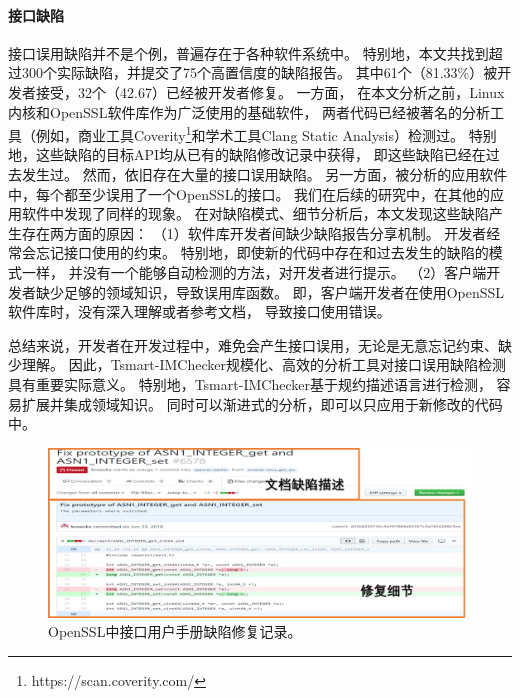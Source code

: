 \paragraph{接口缺陷}
接口误用缺陷并不是个例，普遍存在于各种软件系统中。
特别地，本文共找到超过300个实际缺陷，并提交了75个高置信度的缺陷报告。
其中61个（81.33\%）被开发者接受，32个（42.67）已经被开发者修复。
一方面，
在本文分析之前，Linux内核和OpenSSL软件库作为广泛使用的基础软件，
两者代码已经被著名的分析工具（例如，商业工具Coverity\footnote{https://scan.coverity.com/}和学术工具Clang Static Analysis）检测过。
特别地，这些缺陷的目标API均从已有的缺陷修改记录中获得，
即这些缺陷已经在过去发生过。
然而，依旧存在大量的接口误用缺陷。
另一方面，被分析的应用软件中，每个都至少误用了一个OpenSSL的接口。
我们在后续的研究中，在其他的应用软件中发现了同样的现象。
在对缺陷模式、细节分析后，本文发现这些缺陷产生存在两方面的原因：
（1）软件库开发者间缺少缺陷报告分享机制。
开发者经常会忘记接口使用的约束。
特别地，即使新的代码中存在和过去发生的缺陷的模式一样，
并没有一个能够自动检测的方法，对开发者进行提示。
（2）客户端开发者缺少足够的领域知识，导致误用库函数。
即，客户端开发者在使用OpenSSL软件库时，没有深入理解或者参考文档，
导致接口使用错误。

总结来说，开发者在开发过程中，难免会产生接口误用，无论是无意忘记约束、缺少理解。
因此，Tsmart-IMChecker规模化、高效的分析工具对接口误用缺陷检测具有重要实际意义。
特别地，Tsmart-IMChecker基于规约描述语言进行检测，
容易扩展并集成领域知识。
同时可以渐进式的分析，即可以只应用于新修改的代码中。
\begin{figure}[b]
	\centering
	\includegraphics[width=0.8\linewidth]{figures/cp4-doc-bug.png}
	\caption{
		OpenSSL中接口用户手册缺陷修复记录。
	}
	\label{fig:4-4-doc-bug}
\end{figure}
